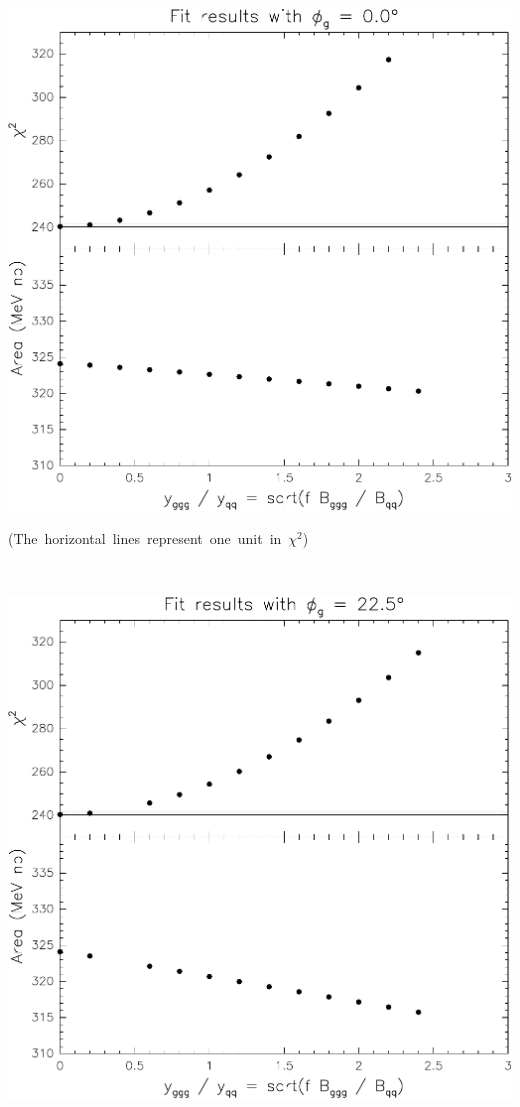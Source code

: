 \documentclass[12pt]{article}
\begin{document}
\mbox{ }

\vfill

\includegraphics[width=\linewidth]{interference-a}

\vfill

\mbox{(The horizontal lines represent one unit in $\chi^2$)}

\pagebreak

\mbox{ }

\vfill

\includegraphics[width=\linewidth]{interference-b}
\end{document}
